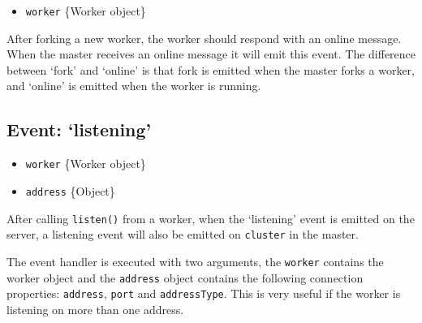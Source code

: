 \begin{itemize}
\itemsep1pt\parskip0pt
\item
  \texttt{worker} \{Worker object\}
\end{itemize}

After forking a new worker, the worker should respond with an online
message. When the master receives an online message it will emit this
event. The difference between `fork' and `online' is that fork is
emitted when the master forks a worker, and `online' is emitted when the
worker is running.

\begin{Shaded}
\begin{Highlighting}[]
\NormalTok{(}\NormalTok{, }
  \NormalTok{(}\NormalTok{);}
\NormalTok{\});}
\end{Highlighting}
\end{Shaded}

\subsection{Event: `listening'}\label{event-listening}

\begin{itemize}
\itemsep1pt\parskip0pt
\item
  \texttt{worker} \{Worker object\}
\item
  \texttt{address} \{Object\}
\end{itemize}

After calling \texttt{listen()} from a worker, when the `listening'
event is emitted on the server, a listening event will also be emitted
on \texttt{cluster} in the master.

The event handler is executed with two arguments, the \texttt{worker}
contains the worker object and the \texttt{address} object contains the
following connection properties: \texttt{address}, \texttt{port} and
\texttt{addressType}. This is very useful if the worker is listening on
more than one address.

\begin{Shaded}
\begin{Highlighting}[]
\NormalTok{(}\NormalTok{, }
  \NormalTok{(} \NormalTok{+ } \NormalTok{+ } \NormalTok{+ }\NormalTok{);}
\NormalTok{\});}
\end{Highlighting}
\end{Shaded}

